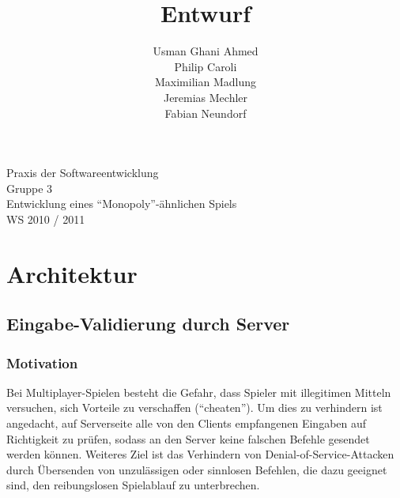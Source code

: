 \documentclass[a4paper,10pt]{article}
\title{Entwurf}
\date{}
\author{Usman Ghani Ahmed \\
Philip Caroli\\
Maximilian Madlung\\ 
Jeremias Mechler\\ 
Fabian Neundorf}
\begin{document}
 
\vspace{5cm}
\maketitle
\begin{center}
\vspace{3cm}
\huge{Praxis der Softwareentwicklung \\
Gruppe 3 \\[0.5cm]
Entwicklung eines "`Monopoly"'-ähnlichen Spiels \\[0.5cm]
WS 2010 / 2011} \\[2cm]
\end{center}

\newpage

\tableofcontents

\newpage

\section{Architektur}
\subsection{Eingabe-Validierung durch Server}
\subsubsection{Motivation}
Bei Multiplayer-Spielen besteht die Gefahr, dass Spieler mit illegitimen Mitteln versuchen, sich Vorteile zu verschaffen ("`cheaten"'). Um dies zu verhindern ist angedacht, auf Serverseite alle von den Clients empfangenen Eingaben auf Richtigkeit zu prüfen, sodass an den Server keine falschen Befehle gesendet werden können. Weiteres Ziel ist das Verhindern von Denial-of-Service-Attacken durch Übersenden von unzulässigen oder sinnlosen Befehlen, die dazu geeignet sind, den reibungslosen Spielablauf zu unterbrechen. 
\end{document}
